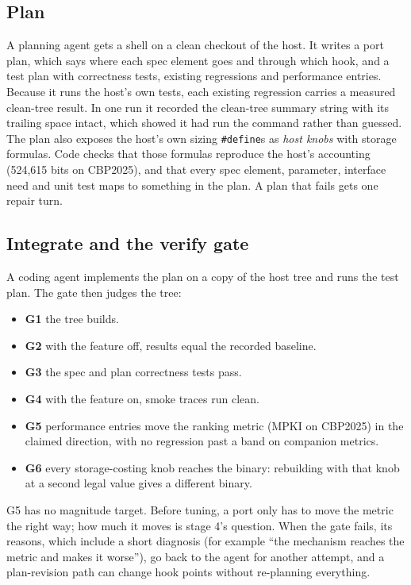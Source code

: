 \documentclass[conference]{IEEEtran}
\begin{document}
\subsection{Plan}

A planning agent gets a shell on a clean checkout of the host. It writes a port
plan, which says where each spec element goes and through which hook, and a
test plan with correctness tests, existing regressions and performance entries.
Because it runs the host's own tests, each existing regression carries a
measured clean-tree result. In one run it recorded the clean-tree summary
string with its trailing space intact, which showed it had run the command
rather than guessed. The plan also exposes the host's own sizing
\texttt{\#define}s as \emph{host knobs} with storage formulas. Code checks that
those formulas reproduce the host's accounting (524,615 bits on CBP2025), and
that every spec element, parameter, interface need and unit test maps to
something in the plan. A plan that fails gets one repair turn.

\subsection{Integrate and the verify gate}

A coding agent implements the plan on a copy of the host tree and runs the test
plan. The gate then judges the tree:
\begin{itemize}
\item \textbf{G1} the tree builds.
\item \textbf{G2} with the feature off, results equal the recorded baseline.
\item \textbf{G3} the spec and plan correctness tests pass.
\item \textbf{G4} with the feature on, smoke traces run clean.
\item \textbf{G5} performance entries move the ranking metric (MPKI on CBP2025)
in the claimed direction, with no regression past a band on companion metrics.
\item \textbf{G6} every storage-costing knob reaches the binary: rebuilding
with that knob at a second legal value gives a different binary.
\end{itemize}
G5 has no magnitude target. Before tuning, a port only has to move the metric
the right way; how much it moves is stage 4's question. When the gate fails,
its reasons, which include a short diagnosis (for example ``the mechanism
reaches the metric and makes it worse''), go back to the agent for another
attempt, and a plan-revision path can change hook points without re-planning
everything.
\end{document}
